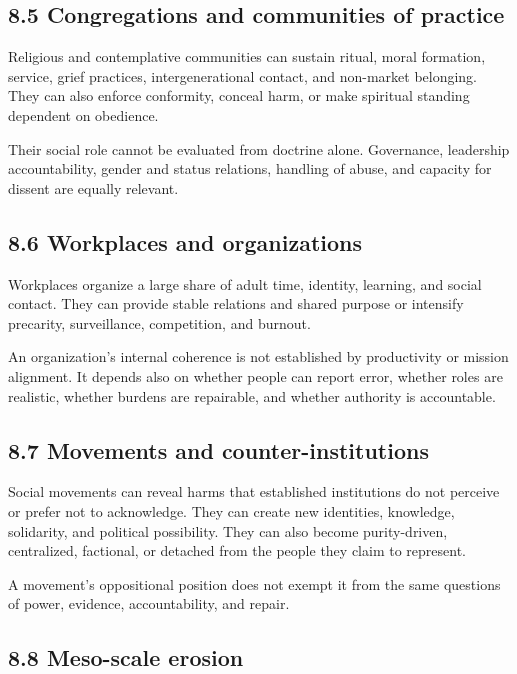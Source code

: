 \documentclass[
  11pt,
]{article}
\begin{document}
\subsection{8.5 Congregations and communities of
practice}\label{congregations-and-communities-of-practice}

Religious and contemplative communities can sustain ritual, moral
formation, service, grief practices, intergenerational contact, and
non-market belonging. They can also enforce conformity, conceal harm, or
make spiritual standing dependent on obedience.

Their social role cannot be evaluated from doctrine alone. Governance,
leadership accountability, gender and status relations, handling of
abuse, and capacity for dissent are equally relevant.

\subsection{8.6 Workplaces and
organizations}\label{workplaces-and-organizations}

Workplaces organize a large share of adult time, identity, learning, and
social contact. They can provide stable relations and shared purpose or
intensify precarity, surveillance, competition, and burnout.

An organization's internal coherence is not established by productivity
or mission alignment. It depends also on whether people can report
error, whether roles are realistic, whether burdens are repairable, and
whether authority is accountable.

\subsection{8.7 Movements and
counter-institutions}\label{movements-and-counter-institutions}

Social movements can reveal harms that established institutions do not
perceive or prefer not to acknowledge. They can create new identities,
knowledge, solidarity, and political possibility. They can also become
purity-driven, centralized, factional, or detached from the people they
claim to represent.

A movement's oppositional position does not exempt it from the same
questions of power, evidence, accountability, and repair.

\subsection{8.8 Meso-scale erosion}\label{meso-scale-erosion}
\end{document}
